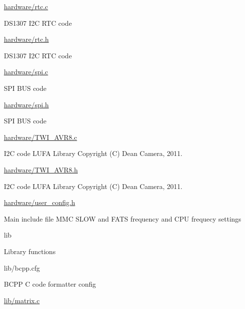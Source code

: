 \begin{DoxyPre}
\begin{DoxyItemize}
\begin{DoxyItemize}
\item \hyperlink{rtc_8c}{hardware/rtc.c}
\begin{DoxyItemize}
\item DS1307 I2C RTC code
\end{DoxyItemize}
\item \hyperlink{rtc_8h}{hardware/rtc.h}
\begin{DoxyItemize}
\item DS1307 I2C RTC code
\end{DoxyItemize}
\item \hyperlink{spi_8c}{hardware/spi.c}
\begin{DoxyItemize}
\item SPI BUS code
\end{DoxyItemize}
\item \hyperlink{spi_8h}{hardware/spi.h}
\begin{DoxyItemize}
\item SPI BUS code
\end{DoxyItemize}
\item \hyperlink{TWI__AVR8_8c}{hardware/TWI\_AVR8.c}
\begin{DoxyItemize}
\item I2C code LUFA Library Copyright (C) Dean Camera, 2011.
\end{DoxyItemize}
\item \hyperlink{TWI__AVR8_8h}{hardware/TWI\_AVR8.h}
\begin{DoxyItemize}
\item I2C code LUFA Library Copyright (C) Dean Camera, 2011.
\end{DoxyItemize}
\item \hyperlink{user__config_8h}{hardware/user\_config.h}
\begin{DoxyItemize}
\item Main include file MMC SLOW and FATS frequency and CPU frequecy settings
\end{DoxyItemize}
\end{DoxyItemize}
\item lib
\begin{DoxyItemize}
\item Library functions
\item lib/bcpp.cfg
\begin{DoxyItemize}
\item BCPP C code formatter config
\end{DoxyItemize}
\item \hyperlink{matrix_8c}{lib/matrix.c}
\begin{DoxyItemize}

\end{DoxyItemize}
\end{DoxyItemize}
\end{DoxyItemize}
\end{DoxyPre}
